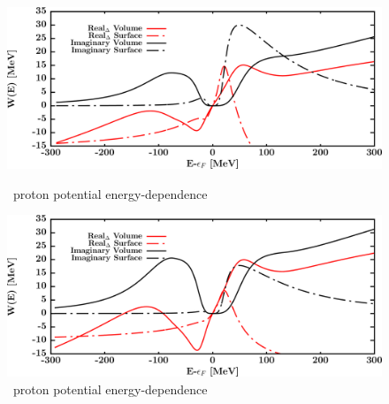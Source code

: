 \begin{figure}[H]
    \centering
    \begin{minipage}{0.45\textwidth}
        \centering
        \includegraphics[width=1.0\textwidth]{figures/sn124_protonPotentials.png}
        \caption{\snFour\ proton potential energy-dependence}
        \label{DOMFitData_sn124_proton_potentialComponent_energy}
    \end{minipage}\hfill
    \begin{minipage}{0.45\textwidth}
        \centering
        \includegraphics[width=1.0\textwidth]{figures/sn124_neutronPotentials.png}
        \caption{\snFour\ proton potential energy-dependence}
        \label{DOMFitData_sn124_neutron_potentialComponent_energy}
    \end{minipage}
\end{figure}

